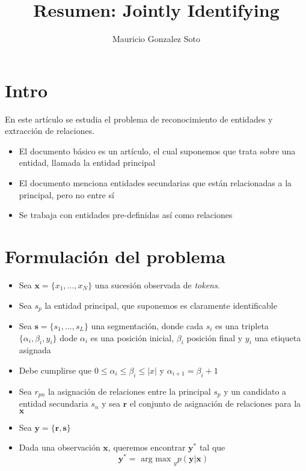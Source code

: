\documentclass[11pt]{article}
\title{Resumen: Jointly Identifying}
\author{Mauricio Gonzalez Soto}
\theoremstyle{plain}
\begin{document}
\maketitle
\section{Intro}
En este artículo se estudia el problema de reconocimiento de entidades y extracción de relaciones.
\begin{itemize}
\item El documento básico es un artículo, el cual suponemos que trata sobre una entidad, llamada la entidad principal
\item El documento menciona entidades secundarias que están relacionadas a la principal, pero no entre sí
\item Se trabaja con entidades pre-definidas así como relaciones
\end{itemize}
\section{Formulación del problema}
\begin{itemize}
\item Sea $\mathbf{x} = \{ x_1,...,x_N \}$ una sucesión observada de \textit{tokens}.
\item Sea $s_p$ la entidad principal, que suponemos es claramente identificable
\item Sea $ \mathbf{s}=\{ s_1,...,s_L\}$ una segmentación, donde cada $s_i$ es una tripleta $\{ \alpha_i, \beta_i,y_i \}$ dode $\alpha_i$ es una posición inicial, $\beta_i$ posición final y $y_i$ una etiqueta asignada 
\item Debe cumplirse que $0 \leq \alpha_i \leq \beta_i \leq |x|$ y $\alpha_{i+1} = \beta_i + 1$
\item Sea $r_{pn}$ la asignación de relaciones entre la principal $s_p$ y un candidato a entidad secundaria $s_n$ y sea $\mathbf{r}$ el conjunto de asignación de relaciones para la $\mathbf{x}$
\item Sea $\mathbf{y}=\{ \mathbf{r},\mathbf{s} \}$
\item Dada una observación $\mathbf{x}$, queremos encontrar $\mathbf{y}^\ast$ tal que
\[ \mathbf{y}^\ast = \textrm{ arg max }_y p(\mathbf{y}| \mathbf{x})\]
\end{itemize}
\end{document}
